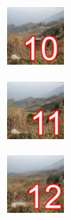 \begin{task}
\begin{gridlayout}{\textwidth}{12cm}
\begin{row}{0.34}
\begin{cell}{0.25}
                \centering
                \includegraphics[width=0.9\cellwidth]{doc-one/img/thumbnail-10.png}
            \end{cell}
            \begin{cell}{0.25}
                \centering
                \includegraphics[width=0.9\cellwidth]{doc-one/img/thumbnail-11.png}
            \end{cell}
            \begin{cell}{0.25}
                \centering
                \includegraphics[width=0.9\cellwidth]{doc-one/img/thumbnail-12.png}
            \end{cell}
        \end{row}
    \end{gridlayout}
\end{task}

\newpage







\tasktwelve

